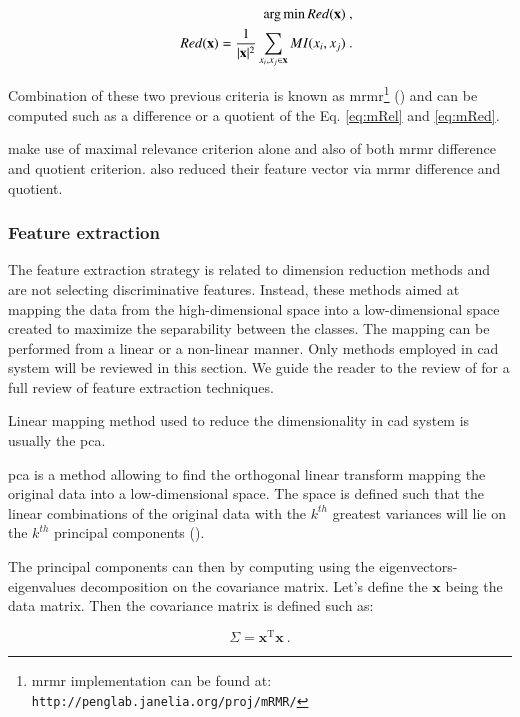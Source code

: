 \begin{eqnarray}
	&&\operatorname*{arg\,min} Red(\mathbf{x}) \ , \nonumber \\
	&& Red(\mathbf{x}) = \frac{1}{|\mathbf{x}|^2} \sum_{x_i,x_j \in \mathbf{x}} MI(x_i,x_j)  \ . \label{eq:mRed}
\end{eqnarray}

Combination of these two previous criteria is known as \ac{mrmr}\footnote{\ac{mrmr} implementation can be found at: \texttt{http://penglab.janelia.\allowbreak org/proj/mRMR/}} (\cite{Peng2005}) and can be computed such as a difference or a quotient of the Eq. \eqref{eq:mRel} and \eqref{eq:mRed}.

\cite{Niaf2011,Niaf2012} make use of maximal relevance criterion alone and also of both \ac{mrmr} difference and quotient criterion. \cite{Viswanath2012} also reduced their feature vector via \ac{mrmr} difference and quotient.

\subsubsection{Feature extraction}

The feature extraction strategy is related to dimension reduction methods and are not selecting discriminative features. Instead, these methods aimed at mapping the data from the high-dimensional space into a low-dimensional space created to maximize the separability between the classes. The mapping can be performed from a linear or a non-linear manner. Only methods employed in \ac{cad} system will be reviewed in this section. We guide the reader to the review of \cite{Fodor2002} for a full review of feature extraction techniques.

Linear mapping method used to reduce the dimensionality in \ac{cad} system is usually the \ac{pca}. 

\ac{pca} is a method allowing to find the orthogonal linear transform mapping the original data into a low-dimensional space. The space is defined such that the linear combinations of the original data with the $k^{th}$ greatest variances will lie on the $k^{th}$ principal components (\cite{Jolliffe2002}).

The principal components can then by computing using the eigenvectors-eigenvalues decomposition on the covariance matrix. Let's define the $\mathbf{x}$ being the data matrix. Then the covariance matrix is defined such as:

\begin{equation}
	\Sigma = \mathbf{x}^{\text{T}} \mathbf{x} \ .
	\label{eq:covmat}
\end{equation}

